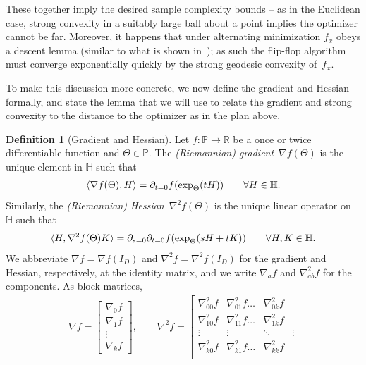 \documentclass[aos]{imsart}
\theoremstyle{definition}
\newtheorem*{definition}{Definition}
\numberwithin{equation}{section}
\newcommand{\R}{{\mathbb{R}}}
\renewcommand{\P}{{\mathbb{P}}}
\renewcommand{\H}{{\mathbb{H}}}
\newcommand{\samp}{x}
\begin{document}
These together imply the desired sample complexity bounds -- as in the Euclidean case, strong convexity in a suitably large ball about a point implies the optimizer cannot be far. Moreover, it happens that under alternating minimization $f_\samp$ obeys a descent lemma (similar to what is shown in~\cite{burgisser2017alternating}); as such the flip-flop algorithm must converge exponentially quickly by the strong geodesic convexity of~$f_\samp$.

To make this discussion more concrete, we now define the gradient and Hessian formally, and state the lemma that we will use to relate the gradient and strong convexity to the distance to the optimizer as in the plan above.

\begin{definition}[Gradient and Hessian]\label{def:hess grad}
Let $f\colon \P \to \R$ be a once or twice differentiable function and $\Theta \in \P$.
The \emph{(Riemannian) gradient}~$\nabla f(\Theta)$ is the unique element in $\H$ such that
\begin{align*}
  \braket{\nabla f(\Theta), H}
= \partial_{t=0} f(\exp_\Theta(tH))
\qquad \forall H \in \H.
\end{align*}
Similarly, the \emph{(Riemannian) Hessian}~$\nabla^2 f(\Theta)$ is the unique linear operator on~$\H$ such that
\begin{align*}
  \braket{H, \nabla^2 f(\Theta) K}
= \partial_{s=0} \partial_{t=0} f(\exp_{\Theta}(sH + tK))
\qquad \forall H,K \in \H.
\end{align*}
We abbreviate $\nabla f = \nabla f(I_D)$ and $\nabla^2 f = \nabla^2 f(I_D)$ for the gradient and Hessian, respectively, at the identity matrix, and we write $\nabla_a f$ and $\nabla^2_{ab}f$ for the components.
As block matrices,
\begin{align*}
  \nabla f = \left[\begin{array}{c} \nabla_0 f \\ \hline \nabla_1 f \\ \vdots \\ \nabla_k f \end{array}\right],
  \qquad
  \nabla^2 f = \left[\begin{array}{c|ccc}
  \nabla_{00}^2 f & \nabla_{01}^2 f \dots & \nabla_{0k}^2 f \\
    \hline\nabla_{10}^2 f & \nabla_{11}^2 f \dots & \nabla_{1k}^2 f \\
  \vdots  & \vdots & \ddots & \vdots \\
  \nabla_{k0}^2 f & \nabla_{k1}^2 f \dots & \nabla_{kk}^2 f \\

\end{array}
\end{align*}
\end{definition}
\end{document}
